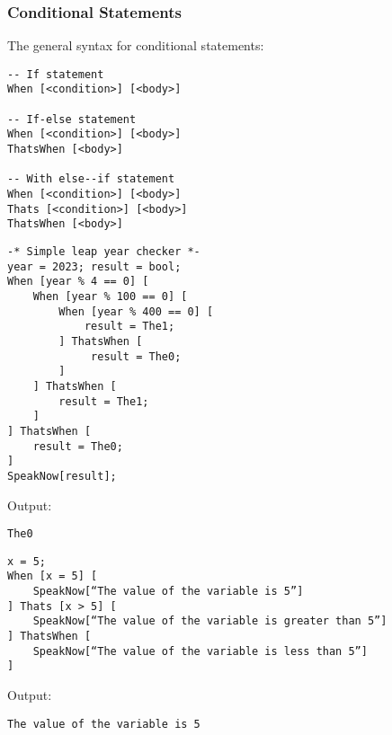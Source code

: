 \subsubsection{Conditional Statements}

The general syntax for conditional statements:
\begin{verbatim}
-- If statement
When [<condition>] [<body>]

-- If-else statement
When [<condition>] [<body>]
ThatsWhen [<body>]

-- With else--if statement
When [<condition>] [<body>]
Thats [<condition>] [<body>]
ThatsWhen [<body>]
\end{verbatim}
\begin{verbatim}
-* Simple leap year checker *-
year = 2023; result = bool;
When [year % 4 == 0] [
    When [year % 100 == 0] [
        When [year % 400 == 0] [
            result = The1;
        ] ThatsWhen [
             result = The0;
        ]
    ] ThatsWhen [
        result = The1;
    ]
] ThatsWhen [
    result = The0;
]
SpeakNow[result];
\end{verbatim}
Output:
\begin{verbatim}
The0
\end{verbatim}
\begin{verbatim}
x = 5;
When [x = 5] [
    SpeakNow[“The value of the variable is 5”]
] Thats [x > 5] [
    SpeakNow[“The value of the variable is greater than 5”]
] ThatsWhen [
    SpeakNow[“The value of the variable is less than 5”]
]
\end{verbatim}
Output:
\begin{verbatim}
The value of the variable is 5
\end{verbatim}